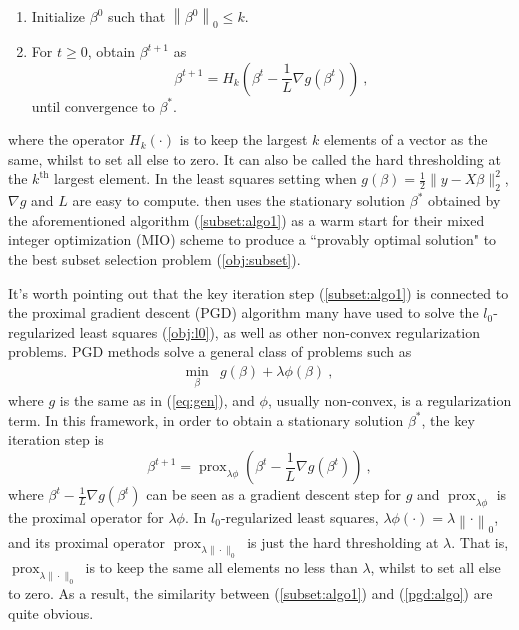 \documentclass[11pt]{article}%
\newcommand{\prox}{ \mathop{\mathrm{prox}} }
\numberwithin{equation}{section}
\theoremstyle{plain}
\begin{document}
\begin{enumerate}
\item Initialize $\beta^0$ such that $\left\|\beta^0\right\|_0 \leq k$.
\item For $t \geq 0$, obtain $\beta^{t + 1}$ as
\begin{equation}
\label{subset:algo1}
\beta^{t + 1} = H_k\left(\beta^t - \frac1L\nabla g\left(\beta^t\right)\right) \ ,
\end{equation}
until convergence to $\beta^*$.
\end{enumerate}
where the operator $H_k\left(\cdot\right)$ is to keep the largest $k$ elements of a vector as the same, whilst to set all else to zero.  It can also be called the hard thresholding at the $k^\text{th}$ largest element.  In the least squares setting when $g(\beta) = \frac12\|y - X\beta\|_2^2$, $\nabla g$ and $L$ are easy to compute.  \cite{bertsimas2016} then uses the stationary solution $\beta^*$ obtained by the aforementioned algorithm (\ref{subset:algo1}) as a warm start for their mixed integer optimization (MIO) scheme to produce a ``provably optimal solution" to the best subset selection problem (\ref{obj:subset}).

It's worth pointing out that the key iteration step (\ref{subset:algo1}) is connected to the proximal gradient descent (PGD) algorithm many have used to solve the $l_0$-regularized least squares (\ref{obj:l0}), as well as other non-convex regularization problems.  PGD methods solve a general class of problems such as
\begin{equation}
  \label{obj:pgd}
  \begin{array}{rl}
\min\limits_{\beta} & g(\beta) + \lambda\phi(\beta) \ ,
  \end{array}
\end{equation}
where $g$ is the same as in (\ref{eq:gen}), and $\phi$, usually non-convex, is a regularization term.  In this framework, in order to obtain a stationary solution $\beta^*$, the key iteration step is
\begin{equation}
  \label{pgd:algo}
\beta^{t + 1} = \prox_{\lambda\phi}\left(\beta^t - \frac1L\nabla g\left(\beta^t\right)\right) \ ,
\end{equation}
where $\beta^t - \frac1L\nabla g(\beta^t)$ can be seen as a gradient descent step for $g$ and $\prox_{\lambda\phi}$ is the proximal operator for $\lambda\phi$.  In $l_0$-regularized least squares, $\lambda\phi\left(\cdot\right) = \lambda\left\|\cdot\right\|_0$, and its proximal operator $\prox_{\lambda\|\cdot\|_0}$ is just the hard thresholding at $\lambda$.  That is, $\prox_{\lambda\|\cdot\|_0}$ is to keep the same all elements no less than $\lambda$, whilst to set all else to zero.  As a result, the similarity between (\ref{subset:algo1}) and (\ref{pgd:algo}) are quite obvious.
\end{document}
